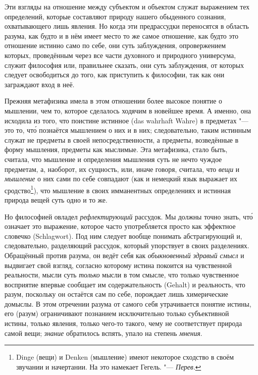 Эти взгляды на отношение между субъектом и объектом служат выражением тех
определений, которые составляют природу нашего обыденного
сознания, охватывающего лишь явления. Но когда эти предрассудки переносятся в область разума, как будто
и в нём имеет место то же самое отношение, как будто это отношение истинно
само по себе,
они суть заблуждения, опровержением которых, проведённым
через все части духовного и природного универсума, служит философия или,
правильнее сказать, они суть заблуждения, от которых следует
освободиться до того, как приступить к философии, так как они заграждают
вход в неё.

Прежняя метафизика имела в этом отношении более высокое понятие о мышлении,
чем то, которое сделалось ходячим в новейшее время. А именно, она исходила из
того, что поистине истинное (das wahrhaft Wahre) в предметах "--- это то, чт\'{о} познаётся
мышлением о них и в них;
следовательно, таким истинным служат не предметы в своей
непосредственности, а предметы, возведённые в форму мышления,
предметы как мыслимые. Эта метафизика, стало быть, считала, что мышление и
определения мышления суть не нечто чуждое предметам, а, наоборот, их
сущность, или, иначе говоря, считала, что {\em вещи} и
{\em мышление} о них сами по себе совпадают (как и немецкий
язык выражает их сродство\footnote{Dinge (вещи) и Denken (мышление) имеют
некоторое сходство в своём звучании и начертании. На это намекает
Гегель. "--- {\em Перев}.}), что мышление в своих имманентных определениях
и истинная природа вещей суть одно и то же.

Но философией овладел {\em рефлектирующий} рассудок. Мы
должны точно знать, чт\'{о} означает это выражение, которое часто употребляется
просто как эффектное словечко (Schlagwort). Под ним следует вообще понимать
абстрагирующий и, следовательно, разделяющий рассудок, который упорствует в
своих разделениях. Обращённый против разума, он ведёт себя как
{\em обыкновенный здравый смысл} и выдвигает свой
взгляд, согласно которому истина покоится на чувственной реальности, мысли
суть {\em только} мысли в том смысле, что только
чувственное восприятие впервые сообщает им содержательность (Gehalt) и
реальность, что разум, поскольку он остаётся сам по себе, порождает лишь
химерические домыслы.
В этом отречении разума от самого себя утрачивается понятие истины, его
(разум) ограничивают познанием исключительно только субъективной истины,
только явления, только чего-то такого, чему не соответствует природа самой
вещи; {\em знание} обратилось вспять, упало на степень {\em мнения}.

